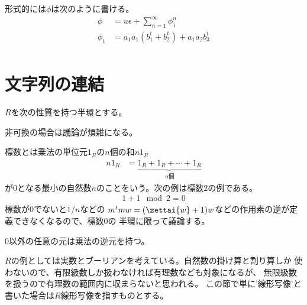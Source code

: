 	形式的には$\phi$は次のように書ける。
	\begin{equation*}\begin{split} %
		\phi &= u\epsilon + \sum_{n=1}^\infty \phi_1^n \\
		\phi_1 &= a_1a_1(b_1^t + b_2^t) + a_1a_2b_3^t \\
	\end{split}\end{equation*} %
\endgroup %
\begingroup %
	\newcommand{\Word}[1]{\ensuremath{\mathcal{W}{#1}}}
	\newcommand{\wordu}[1]{\ensuremath{1_{\Word{#1}}}}
	\newcommand{\word}[1]{\ensuremath{[{#1}]}}
	\newcommand{\wordg}[1]{\ensuremath{\bigl[{#1}\bigr]}}
	\newcommand{\wordgg}[1]{\ensuremath{\biggl[{#1}\biggr]}}
	\newcommand{\mydef}{\ensuremath{\overset{\mathrm{def}}{=}}}
	\newcommand{\lin}[1]{\ensuremath{\myop{lin}{#1}}}
	\newcommand{\push}[1]{\ensuremath{\myop{push}{#1}}}
	\newcommand{\pop}[1]{\ensuremath{\myop{pop}{#1}}}
	\newcommand{\lfnc}[2]{\ensuremath{\lambda_{#1}{#2}}}
	\newcommand{\moji}[1]{\ensuremath{\myop{\mathbf{#1}}}}
\section{文字列の連結}\label{s1:文字列の連結} %
	$R$を次の性質を持つ半環とする。
	\begin{description}\setlength{\itemsep}{-1mm} %
		\item[可換] 非可換の場合は議論が煩雑になる。
		\item[標数が$0$] 標数とは乗法の単位元$1_R$の$n$個の和$n1_R$
		\begin{equation*}\begin{split} %
			n1_R &= \underbrace{1_R+1_R+\cdots+1_R}_{n\text{個}}
		\end{split}\end{equation*} %
		が$0$となる最小の自然数$n$のことをいう。次の例は標数$2$の例である。
		\begin{equation*}\begin{split} %
			1 + 1 \mod 2 = 0
		\end{split}\end{equation*} %
		標数が$0$でないと$1/n$などの
		$m^tmw=(\zettai{w}+1)w$などの作用素の逆が定義できなくなるので、標数$0$の
		半環に限って議論する。
		\item[割り算を持つ] $0$以外の任意の元は乗法の逆元を持つ。
	\end{description} %
	$R$の例としては実数とブーリアンを考えている。自然数の掛け算と割り算しか
	使わないので、有限級数しか扱わなければ有理数なども対象になるが、
	無限級数を扱うので有理数の範囲内に収まらないと思われる。
	この節で単に'線形写像'と書いた場合は$R$線形写像を指すものとする。

